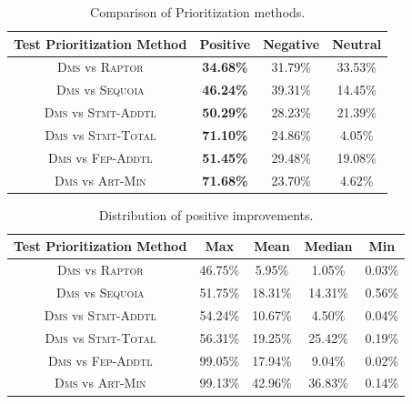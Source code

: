 \begin{table}[tbp]
    \centering
		\caption{Comparison of Prioritization methods.}
		\renewcommand{\arraystretch}{1.5}
		\small
        \begin{tabular}{|c|c|c|c|}
			\hline
			Test Prioritization Method  &  Positive  &  Negative  &   Neutral  \\
			\hline\hline
			\textsc{Dms} vs \textsc{Raptor} & {\bf 34.68\%} &    31.79\% &    33.53\% \\
			\hline
			\textsc{Dms} vs \textsc{Sequoia} & {\bf 46.24\%} &    39.31\% &    14.45\% \\
			\hline
			\textsc{Dms} vs \textsc{Stmt-Addtl} & {\bf 50.29\%} &    28.23\% &    21.39\% \\
			\hline
			\textsc{Dms} vs \textsc{Stmt-Total} & {\bf 71.10\%} &    24.86\% &    4.05\% \\
			\hline
			\textsc{Dms} vs \textsc{Fep-Addtl} & {\bf 51.45\%} &   29.48\% &    19.08\% \\
			\hline
			\textsc{Dms} vs \textsc{Art-Min} & {\bf 71.68\%} &    23.70\% &    4.62\% \\
			\hline
		\end{tabular}
    \label{tab:compare_1}
\end{table}


\begin{table}[tbp]
    \centering
		\caption{Distribution of positive improvements.}
		\renewcommand{\arraystretch}{1.5}
		\small
        \begin{tabular}{|c|c|c|c|c|}
			\hline
			Test Prioritization Method  &        Max &       Mean &     Median &        Min \\
			\hline\hline
			\textsc{Dms} vs \textsc{Raptor} & {  46.75\%} &     5.95\% &     1.05\% &     0.03\% \\
			\hline
			\textsc{Dms} vs \textsc{Sequoia} & {  51.75\%} &   18.31\% &     14.31\% &     0.56\% \\
			\hline
			\textsc{Dms} vs \textsc{Stmt-Addtl} & {   54.24\%} &    10.67\% &     4.50\% &     0.04\% \\
			\hline
			\textsc{Dms} vs \textsc{Stmt-Total} & {  56.31\%} &    19.25\% &    25.42\% &     0.19\% \\
			\hline
			\textsc{Dms} vs \textsc{Fep-Addtl} & {  99.05\%} &    17.94\% &     9.04\% &     0.02\% \\
			\hline
			\textsc{Dms} vs \textsc{Art-Min} & {  99.13\%} &     42.96\% &     36.83\% &     0.14\% \\
			\hline
		\end{tabular}
    \label{tab:compare_2}
\end{table}


